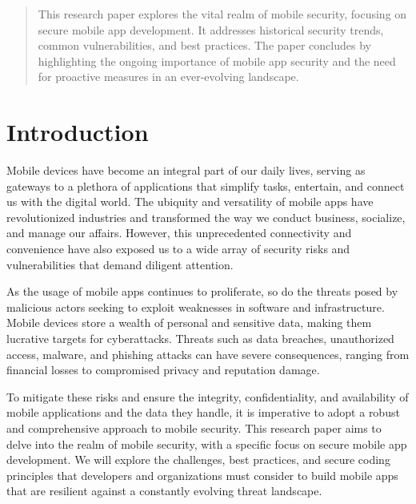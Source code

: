 \documentclass[conference]{IEEEtran}
\begin{document}




\maketitle


\begin{abstract}
This research paper explores the vital realm of mobile security, focusing on secure mobile app development. It addresses historical security trends, common vulnerabilities, and best practices. The paper concludes by highlighting the ongoing importance of mobile app security and the need for proactive measures in an ever-evolving landscape.
\end{abstract}

\IEEEpeerreviewmaketitle
\section{Introduction}

Mobile devices have become an integral part of our daily lives, serving as gateways to a plethora of applications that simplify tasks, entertain, and connect us with the digital world. The ubiquity and versatility of mobile apps have revolutionized industries and transformed the way we conduct business, socialize, and manage our affairs. However, this unprecedented connectivity and convenience have also exposed us to a wide array of security risks and vulnerabilities that demand diligent attention.

As the usage of mobile apps continues to proliferate, so do the threats posed by malicious actors seeking to exploit weaknesses in software and infrastructure. Mobile devices store a wealth of personal and sensitive data, making them lucrative targets for cyberattacks. Threats such as data breaches, unauthorized access, malware, and phishing attacks can have severe consequences, ranging from financial losses to compromised privacy and reputation damage.

To mitigate these risks and ensure the integrity, confidentiality, and availability of mobile applications and the data they handle, it is imperative to adopt a robust and comprehensive approach to mobile security. This research paper aims to delve into the realm of mobile security, with a specific focus on secure mobile app development. We will explore the challenges, best practices, and secure coding principles that developers and organizations must consider to build mobile apps that are resilient against a constantly evolving threat landscape.
\end{document}
